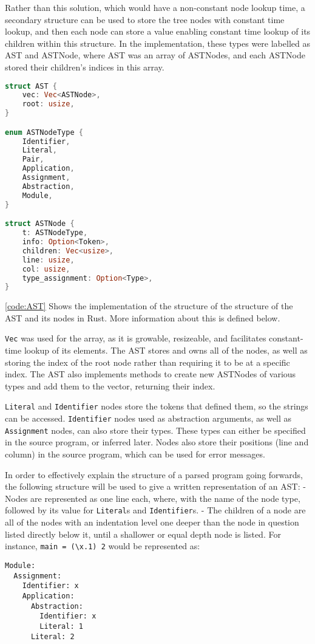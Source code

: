 \documentclass[
author={Kiran Sturt},
degree={BSc},
title={Implementing a Step by Step Evaluator for a Simple Functional Programming language},
unit={COMS30045},]{dissertation}
\begin{document}
Rather than this solution, which would have a non-constant node lookup time, a secondary structure can be used to store the tree nodes with constant time lookup, and then each node can store a value enabling constant time lookup of its children within this structure. In the implementation, these types were labelled as AST and ASTNode, where AST was an array of ASTNodes, and each ASTNode stored their children's indices in this array. 

\begin{lstlisting}[float={t},caption={The Rust structures representing the tree (ignoring access modifiers, lifetime specifiers and details only relevant to formatting)},label={code:AST},language=Rust]
struct AST {
    vec: Vec<ASTNode>,
    root: usize,
}

enum ASTNodeType {
    Identifier,
    Literal,
    Pair,
    Application,
    Assignment,
    Abstraction,
    Module,
}

struct ASTNode {
    t: ASTNodeType,
    info: Option<Token>,
    children: Vec<usize>,
    line: usize,
    col: usize,
    type_assignment: Option<Type>,
}
\end{lstlisting}

\ref{code:AST} Shows the implementation of the structure of the structure of the AST and its nodes in Rust. More information about this is defined below. 

\verb|Vec| was used for the array, as it is growable, resizeable, and facilitates constant-time lookup of its elements. The AST stores and owns all of the nodes, as well as storing the index of the root node rather than requiring it to be at a specific index. The AST also implements methods to create new ASTNodes of various types and add them to the vector, returning their index.

\verb|Literal| and \verb|Identifier| nodes store the tokens that defined them, so the strings can be accessed. \verb|Identifier| nodes used as abstraction arguments, as well as \verb|Assignment| nodes, can also store their types. These types can either be specified in the source program, or inferred later. Nodes also store their positions (line and column) in the source program, which can be used for error messages. 

In order to effectively explain the structure of a parsed program going forwards, the following structure will be used to give a written representation of an AST:
	- Nodes are represented as one line each, where, with the name of the node type, followed by its value for \verb|Literal|s and \verb|Identifier|s.
	- The children of a node are all of the nodes with an indentation level one deeper than the node in question listed directly below it, until a shallower or equal depth node is listed. 
For instance, \verb|main = (\x.1) 2| would be represented as:
\begin{lstlisting}
Module:
  Assignment:
    Identifier: x
    Application:
      Abstraction:
        Identifier: x
        Literal: 1
      Literal: 2
\end{lstlisting}
\end{document}
